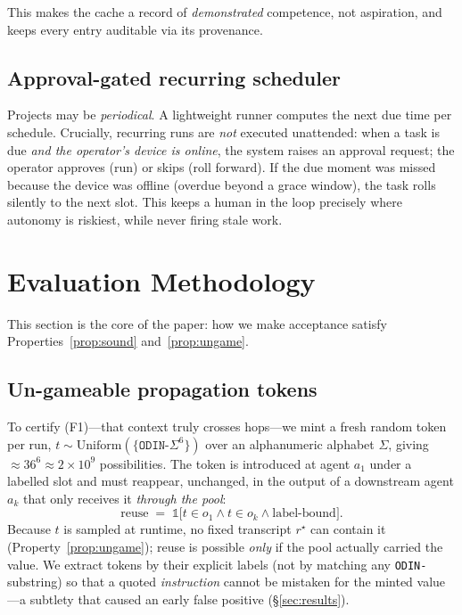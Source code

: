 \documentclass[10pt,twocolumn]{article}
\begin{document}
This makes the cache a record of \emph{demonstrated} competence, not
aspiration, and keeps every entry auditable via its provenance.

\subsection{Approval-gated recurring scheduler}
Projects may be \emph{periodical}. A lightweight runner computes the next due
time per schedule. Crucially, recurring runs are \emph{not} executed
unattended: when a task is due \emph{and the operator's device is online}, the
system raises an approval request; the operator approves (run) or skips (roll
forward). If the due moment was missed because the device was offline (overdue
beyond a grace window), the task rolls silently to the next slot. This keeps a
human in the loop precisely where autonomy is riskiest, while never firing
stale work.

\section{Evaluation Methodology}\label{sec:eval}
This section is the core of the paper: how we make acceptance satisfy
Properties~\ref{prop:sound} and~\ref{prop:ungame}.

\subsection{Un-gameable propagation tokens}
To certify (F1)---that context truly crosses hops---we mint a fresh random
token per run, $t \sim \mathrm{Uniform}(\{\texttt{ODIN-}\Sigma^6\})$ over an
alphanumeric alphabet $\Sigma$, giving $\approx 36^6 \approx 2{\times}10^9$
possibilities. The token is introduced at agent $a_1$ under a labelled slot and
must reappear, unchanged, in the output of a downstream agent $a_k$ that only
receives it \emph{through the pool}:
\[
\mathrm{reuse} \;=\; \mathbb{1}\bigl[t \in o_1 \wedge t \in o_k \wedge \text{label-bound}\bigr].
\]
Because $t$ is sampled at runtime, no fixed transcript $r^\star$ can contain it
(Property~\ref{prop:ungame}); reuse is possible \emph{only} if the pool
actually carried the value. We extract tokens by their explicit labels (not by
matching any \texttt{ODIN-} substring) so that a quoted \emph{instruction}
cannot be mistaken for the minted value---a subtlety that caused an early
false positive (\S\ref{sec:results}).
\end{document}
